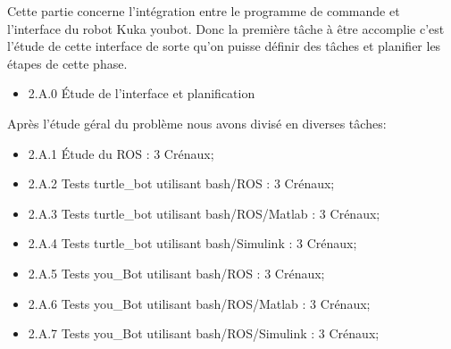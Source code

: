 

Cette partie concerne l’intégration entre le programme de commande et l’interface du robot Kuka youbot. Donc la première tâche à être accomplie c’est l’étude de cette interface de sorte qu’on puisse définir des tâches et planifier les étapes de cette phase.

\begin{itemize}
\item 2.A.0 Étude de l’interface et planification

\end{itemize}

Après l'étude géral du problème nous avons divisé en diverses tâches:

\begin{itemize}
	\item 2.A.1 Étude du ROS : 3 Crénaux;
	\item 2.A.2	Tests turtle\_bot utilisant bash/ROS : 3 Crénaux;
	\item 2.A.3	Tests turtle\_bot utilisant bash/ROS/Matlab : 3 Crénaux;
	\item 2.A.4	Tests turtle\_bot utilisant bash/Simulink : 3 Crénaux;
	\item 2.A.5	Tests you\_Bot utilisant bash/ROS : 3 Crénaux;
	\item 2.A.6	Tests you\_Bot utilisant bash/ROS/Matlab : 3 Crénaux;
	\item 2.A.7	Tests you\_Bot utilisant bash/ROS/Simulink : 3 Crénaux;
\end{itemize}